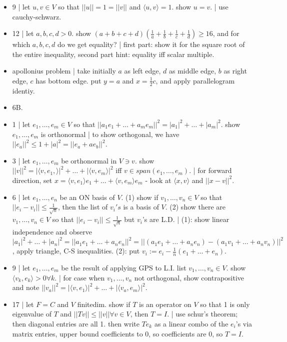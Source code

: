 \begin{itemize}
	\item 9 | let $u,v \in V$ so that $||u||=1=||v||$ and $\langle u,v \rangle =1$. show $u=v$. | use cauchy-schwarz. 
	\item 12 | let $a,b,c,d >0$. show $(a+b+c+d)(\frac{1}{a} + \frac{1}{b} + \frac{1}{c} + \frac{1}{d}) \geq 16$, and for which $a,b,c,d$ do we get equality? | first part: show it for the square root of the entire inequality, second part hint: equality iff scalar multiple. 
	\item apollonius problem | take initially $a$ as left edge, $d$ as middle edge, $b$ as right edge, $c$ has bottom edge. put $y=a$ and $x=\frac{1}{2}c$, and apply parallelogram identiy. 
	\item 6B. 
	\item 1 | let $e_1,\dots,e_m \in V$ so that $||a_1e_1 + \dots + a_me_m||^2 = |a_1|^2 + \dots + |a_m|^2$. show $e_1,\dots,e_m$ is orthonormal | to show orthogonal, we have $||e_a||^2 \leq 1 + |a|^2 = ||e_a + ae_b||^2$. 
	\item 3 | let $e_1,\dots,e_m$ be orthonormal in $V \ni v$. show $||v||^2 = |\langle v,e_1, \rangle|^2 + \dots + |\langle v,e_m \rangle|^2$ iff $v \in span(e_1,\dots,e_m)$. | for forward direction, set $x = \langle v,e_1 \rangle e_1 + \dots + \langle v,e_m \rangle e_m$ - look at $\langle x,v \rangle$ and $||x-v||^2$. 
	\item 6 | let $e_1,\dots,e_n$ be an ON basis of $V$. (1) show if $v_1,\dots,v_n \in V$ so that $||e_i - v_i || \leq \frac{1}{\sqrt{n}}$, then the list of $v_i's$ is a basis of $V$. (2) show there are $v_1,\dots,v_n \in V$ so that $||e_i - v_i|| \leq \frac{1}{\sqrt{n}}$ but $v_i$'s are L.D. | (1): show linear independence and observe $|a_1|^2 + \dots + |a_n|^2 = ||a_1e_1 + \dots + a_ne_n||^2 = ||(a_1e_1 + \dots + a_ne_n) - (a_1v_1 + \dots + a_nv_n)||^2$, apply triangle, C-S inequalities. (2): put $v_i := e_i - \frac{1}{n}(e_1 + \dots + e_n)$. 
	\item 9 | let $e_1,\dots,e_m$ be the result of applying GPS to L.I. list $v_1,\dots,v_n \in V$. show $\langle v_k,e_k \rangle > 0 \forall k$. | for case when $v_1,\dots,v_n$ not orthogonal, show contrapositive and note $||v_a||^2 = |\langle v,e_1 \rangle|^2 + \dots + |\langle v_a,e_m \rangle|^2$. 
	\item 17 | let $F=C$ and $V$ finitedim. show if $T$ is an operator on $V$ so that 1 is only eigenvalue of $T$ and $||Tv|| \leq ||v|| \forall v \in V$, then $T=I$. | use schur's theorem; then diagonal entries are all 1. then write $Te_k$ as a linear combo of the $e_i$'s via matrix entries, upper bound coefficients to 0, so coefficients are 0, so $T=I$. 

\end{itemize}
